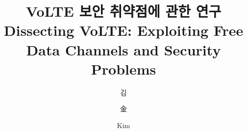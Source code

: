 \documentclass[master,english,final]{kaist-ucs}
\title[korean] {VoLTE 보안 취약점에 관한 연구}
\title[english]{Dissecting VoLTE: Exploiting Free Data Channels and Security Problems}
\author[korean] {김}{동관}
\author[chinese]{金}{東 寬}
\author[english]{Kim}{Dongkwan}
\begin{document}


\makecontents





%
%













\end{document}
